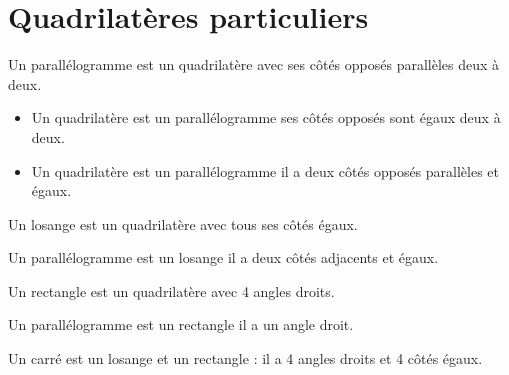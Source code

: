\section{Quadrilatères particuliers}


{Un parallélogramme est un quadrilatère avec ses côtés opposés parallèles deux à deux.}

{\begin{itemize}
    \item Un quadrilatère est un parallélogramme \ssi ses côtés opposés sont égaux deux à deux.
    \item Un quadrilatère est un parallélogramme \ssi il a deux côtés opposés parallèles et égaux.
\end{itemize}}


{Un losange est un quadrilatère avec tous ses côtés égaux.}

{Un parallélogramme est un losange \ssi il a deux côtés adjacents et égaux.}


{Un rectangle est un quadrilatère avec 4 angles droits.}

{Un parallélogramme est un rectangle \ssi il a un angle droit.}


{Un carré est un losange et un rectangle : il a 4 angles droits et 4 côtés égaux.}

\begin{center}
\end{center}
